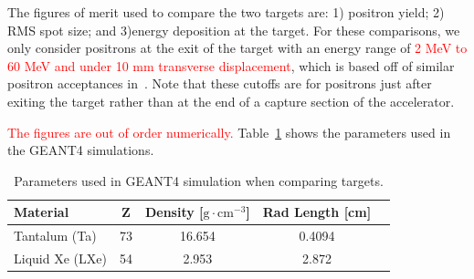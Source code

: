 \documentclass[
reprint,
nofootinbib,
amsmath, amssymb,
aps,
floatfix,
]{revtex4-2}
\begin{document}


The figures of merit used to compare the two targets are: 1) positron yield; 2) RMS spot size; and 3)energy deposition at the target.  For these comparisons, we only consider positrons at the exit of the target with an energy range of \textcolor{red}{2 MeV to 60 MeV and under 10 mm transverse displacement}, which is based off of similar positron acceptances in~\cite{Tang1995, Sheppard2003}.  Note that these cutoffs are for positrons just after exiting the target rather than at the end of a capture section of the accelerator.

\textcolor{red}{The figures are out of order numerically.}
Table~\ref{tab:G4Params} shows the parameters used in the GEANT4 simulations.
\begin{table}[h]
    \centering
    \begin{tabular}{lcccc}
        \hline \hline
        \textbf{Material} & \textbf{Z} & \textbf{Density} [$\textrm{g} \cdot \textrm{cm}^{-3} $] & \textbf{Rad Length} [cm] \\
        \hline
        Tantalum (Ta) & 73 & 16.654 & 0.4094 \\
        Liquid Xe (LXe) & 54 & 2.953 & 2.872 \\
        \hline \hline
    \end{tabular}
    \caption{\label{tab:G4Params}Parameters used in GEANT4 simulation when comparing targets.}
\end{table}
\end{document}
